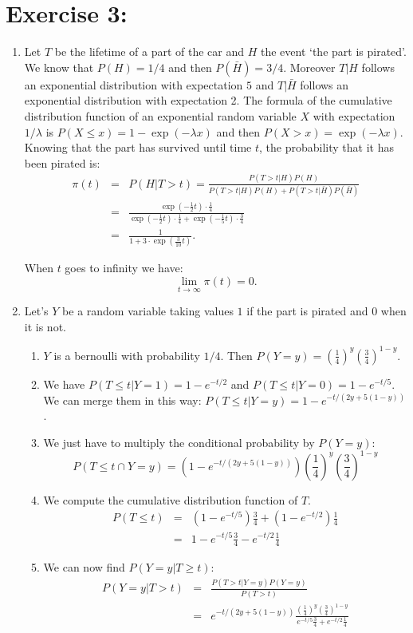 \documentclass[12pt,thmsa]{article}
\begin{document}
\section*{Exercise 3:}
\begin{enumerate}
  \item Let $T$ be the lifetime of a part of the car and $H$ the event `the part is pirated'. We know that $P(H)=1/4$ and then $P(\bar{H})=3/4$. Moreover $T\vert H$ follows an exponential distribution with expectation $5$ and $T\vert \bar{H}$ follows an exponential distribution with expectation 2.
The formula of the cumulative distribution function of an exponential random variable $X$ with expectation $1/\lambda$ is $P(X\leq x)=1-\exp(-\lambda x)$ and then $P(X>x)=\exp(-\lambda x)$.
Knowing that the part has survived until time $t$, the probability that it has been pirated is:
\begin{eqnarray*}
  \pi(t) &=& P(H\vert T>t)= \frac{P(T>t\vert H) P(H)}{P(T>t \vert H) P(H)+
  P(T>t\vert \bar{H}) P(\bar{H})} \\
   &=& \frac{\exp(-\frac{1}{2}t)\cdot \frac{1}{4}}{\exp(-\frac{1}{2}t)
   \cdot \frac{1}{4} + \exp(-\frac{1}{5}t)\cdot \frac{3}{4}} \\
   &=& \frac{1}{1+3 \cdot \exp(\frac{3}{10}t)}.
\end{eqnarray*}

When $t$ goes to infinity we have:
$$
\lim_{t \rightarrow \infty} \pi(t) =0.
$$
  \item Let's $Y$ be a random variable taking values $1$ if the part is pirated and $0$ when it is not.
\begin{enumerate}
  \item $Y$ is a bernoulli with probability $1/4$. Then $P(Y=y)= \left(\frac{1}{4}\right)^y \left(\frac{3}{4}\right)^{1-y}$.
  \item We have $P(T\leq t \vert Y=1)=1-e^{-t/2}$ and $P(T\leq t \vert Y=0)=1-e^{-t/5}$. We can merge them in this way: $P(T\leq t \vert Y=y)=1-e^{-t/(2y+5(1-y))}$.
  \item We just have to multiply the conditional probability by $P(Y=y)$:
  $$P(T \leq t \cap Y=y)= \left( 1-e^{-t/(2y+5(1-y))} \right) \left(\frac{1}{4}\right)^y \left(\frac{3}{4}\right)^{1-y}$$
  \item We compute the cumulative distribution function of $T$.
  \begin{eqnarray*}
   P(T \leq t) &=& \left(1-e^{-t/5}\right) \frac{3}{4} + \left(1-e^{-t/2}\right) \frac{1}{4}  \\
     &=& 1 - e^{-t/5} \frac{3}{4} - e^{-t/2} \frac{1}{4}
  \end{eqnarray*}
  \item We can now find $P(Y=y\vert T\geq t)$:
  \begin{eqnarray*}
  P(Y=y\vert T> t) &=& \frac{P(T>t\vert Y=y) P(Y=y)}{P(T>t)} \\
   &=& e^{-t/(2y+5(1-y))} \frac{\left(\frac{1}{4}\right)^y \left(\frac{3}{4}\right)^{1-y}}{ e^{-t/5} \frac{3}{4} + e^{-t/2} \frac{1}{4}}
\end{eqnarray*}


\end{enumerate}
\end{enumerate}
\end{document}
